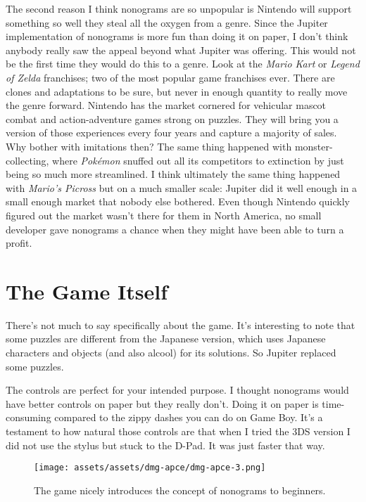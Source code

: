 \documentclass{book}
\begin{document}
The second reason I think nonograms are so unpopular is Nintendo will support something so well they steal all the oxygen from a genre. Since the Jupiter implementation of nonograms is more fun than doing it on paper, I don’t think anybody really saw the appeal beyond what Jupiter was offering. This would not be the first time they would do this to a genre. Look at the \emph{Mario Kart} or \emph{Legend of Zelda} franchises; two of the most popular game franchises ever. There are clones and adaptations to be sure, but never in enough quantity to really move the genre forward. Nintendo has the market cornered for vehicular mascot combat and action-adventure games strong on puzzles. They will bring you a version of those experiences every four years and capture a majority of sales. Why bother with imitations then? The same thing happened with monster-collecting, where \emph{Pokémon} snuffed out all its competitors to extinction by just being so much more streamlined. I think ultimately the same thing happened with \emph{Mario’s Picross} but on a much smaller scale: Jupiter did it well enough in a small enough market that nobody else bothered. Even though Nintendo quickly figured out the market wasn’t there for them in North America, no small developer gave nonograms a chance when they might have been able to turn a profit.

\FloatBarrier\needspace{5pt}\section*{The Game Itself}\nopagebreak[4]

There’s not much to say specifically about the game. It’s interesting to note that some puzzles are different from the Japanese version, which uses Japanese characters and objects (and also alcool) for its solutions. So Jupiter replaced some puzzles.

The controls are perfect for your intended purpose. I thought nonograms would have better controls on paper but they really don’t. Doing it on paper is time-consuming compared to the zippy dashes you can do on Game Boy. It’s a testament to how natural those controls are that when I tried the 3DS version I did not use the stylus but stuck to the D-Pad. It was just faster that way.

\begin{figure}[hbt]
\vskip 10pt
\centering \texttt{[image: assets/assets/dmg-apce/dmg-apce-3.png]}\par\pagetwodescription The game nicely introduces the concept of nonograms to beginners.
\vskip 6pt
\end{figure}
\end{document}
